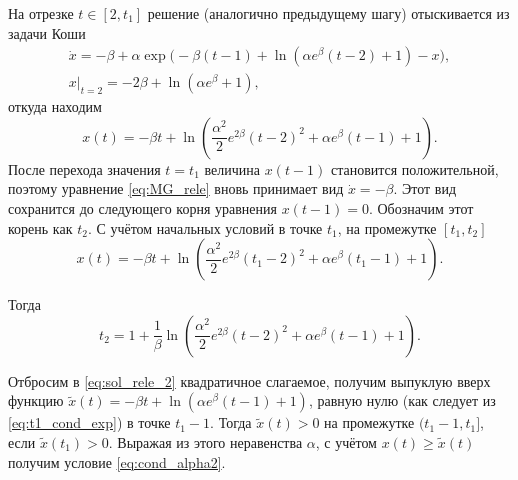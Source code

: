 %
%
%

На отрезке $t \in [2, t_1]$ решение (аналогично предыдущему шагу) отыскивается из задачи Коши 
%
\begin{multline}
    \dot{x} = -\beta + \alpha\exp\bigg(-\beta(t - 1) + \ln(\alpha e^{\beta}(t - 2) + 1) - x\bigg),\\
    x|_{t = 2} = - 2 \beta + \ln(\alpha e^{\beta} + 1),
\end{multline}
%
откуда находим
\begin{equation}
	\label{eq:sol_rele_2}
    x(t) = -\beta t + \ln\left(\frac{\alpha^2}{2}e^{2\beta}(t - 2)^2+\alpha e^{\beta}(t - 1) + 1\right).
\end{equation}
%
После перехода значения $t = t_1$ величина $x(t - 1)$ становится положительной, поэтому уравнение \eqref{eq:MG_rele} вновь принимает вид $\dot{x} = -\beta$. Этот вид сохранится до следующего корня уравнения $x(t - 1) = 0$. Обозначим этот корень как $t_2$. С учётом начальных условий в точке $t_1$, на промежутке $[t_1, t_2]$
\begin{equation}
	\label{eq:sol_rele_3}
	x(t) = -\beta t + \ln\left(\frac{\alpha^2}{2}e^{2\beta}(t_1 - 2)^2 + \alpha e^{\beta}(t_1 - 1) + 1\right).
\end{equation}

Тогда
\begin{equation}
\label{eq:t2}
t_2 = 1 + \dfrac{1}{\beta}\ln\left(\frac{\alpha^2}{2}e^{2\beta}(t - 2)^2 + \alpha e^{\beta}(t - 1) + 1\right).
\end{equation}

Отбросим в \eqref{eq:sol_rele_2} квадратичное слагаемое, получим выпуклую вверх функцию $\tilde{x}(t) = -\beta t + \ln(\alpha e^{\beta} (t - 1) + 1)$, равную нулю (как следует из \eqref{eq:t1_cond_exp}) в точке $t_1 - 1$. Тогда $\tilde{x}(t) > 0$ на промежутке $(t_1 - 1, t_1]$, если $\tilde{x}(t_1) > 0$. Выражая из этого неравенства $\alpha$, с учётом $x(t) \geqslant \tilde{x}(t)$ получим условие \eqref{eq:cond_alpha2}.

